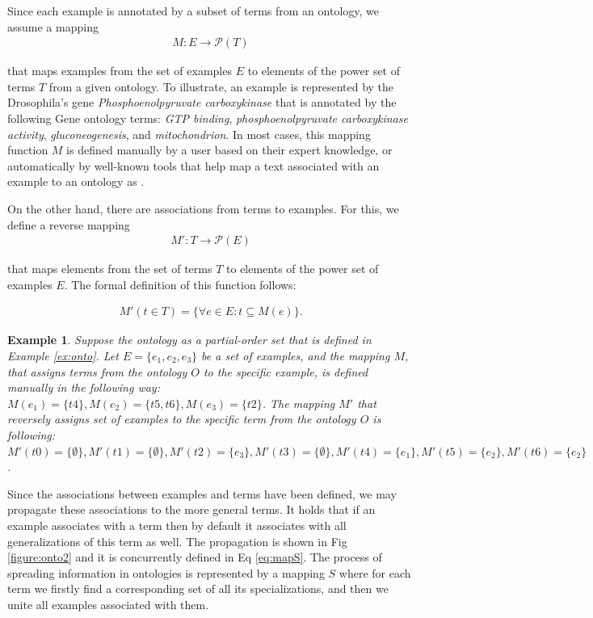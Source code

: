 \documentclass{bmcart}
\newtheorem{example}{Example}
\begin{document}
Since each example is annotated by a subset of terms from an ontology, we assume a mapping
\begin{eqnarray}
\label{eq:mapM}
	 M :  E \rightarrow \mathcal{P}(T)
\end{eqnarray}

that maps examples from the set of examples $E$ to elements of the power set of terms $T$ from a given ontology. To illustrate, an example is represented by the Drosophila's gene \emph{Phosphoenolpyruvate carboxykinase} that is annotated by the following Gene ontology terms: \emph{GTP binding}, \emph{phosphoenolpyruvate carboxykinase activity}, \emph{gluconeogenesis}, and \emph{mitochondrion}. In most cases, this mapping function $M$ is defined manually by a user based on their expert knowledge, or automatically by well-known tools that help map a text associated with an example to an ontology as \cite{zooma}.


On the other hand, there are associations from terms to examples. For this, we define a reverse mapping
\begin{eqnarray}
\label{eq:mapMr}
	 M' : T \rightarrow \mathcal{P}(E)
\end{eqnarray}

that maps elements from the set of terms $T$ to elements of the power set of examples $E$. The formal definition of this function follows: 

\begin{eqnarray}
\label{eq:mapMline}
	 M' (t \in T) = \{\forall e \in E : t \subseteq M(e)\}.
\end{eqnarray}

\begin{example} \label{ex:2}
    Suppose the ontology as a partial-order set that is defined in Example \ref{ex:onto}. Let $E = \{e_1, e_2, e_3\}$ be a set of examples, and the mapping $M$, that assigns terms from the ontology $O$ to the specific example, is defined manually in the following way: $M(e_1) = \{t4\}, M(e_2) = \{t5, t6\}, M(e_3) = \{t2\}$.
    The mapping $M'$ that reversely assigns set of examples to the specific term from the ontology $O$ is following: $M'(t0) = \{\emptyset\}, M'(t1) = \{\emptyset\}, M'(t2) = \{e_3\}, M'(t3) = \{\emptyset\}, M'(t4) = \{e_1\}, M'(t5) = \{e_2\}, M'(t6) = \{e_2\}$.
\end{example}

Since the associations between examples and terms have been defined, we may propagate these associations to the more general terms. It holds that if an example associates with a term then by default it associates with all generalizations of this term as well. The propagation is shown in Fig \ref{figure:onto2} and it is concurrently defined in Eq \ref{eq:mapS}. The process of spreading information in ontologies is represented by a mapping $S$ where for each term we firstly find a corresponding set of all its specializations, and then we unite all examples associated with them.
\end{document}
